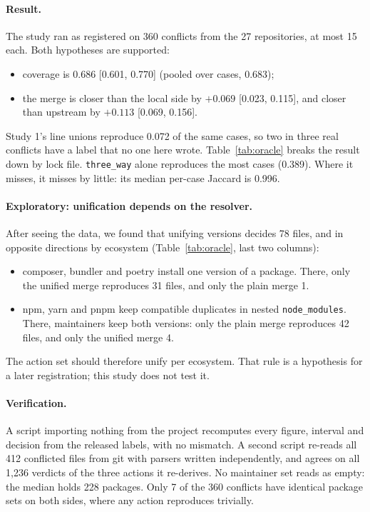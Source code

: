 \documentclass[11pt]{article}
\newcommand{\code}[1]{\texttt{#1}}
\begin{document}
\paragraph{Result.}
The study ran as registered on 360 conflicts from the 27 repositories, at most 15 each. Both
hypotheses are supported:
\begin{itemize}
  \item coverage is 0.686 [0.601, 0.770] (pooled over cases, 0.683);
  \item the merge is closer than the local side by $+0.069$ [0.023, 0.115], and closer than
  upstream by $+0.113$ [0.069, 0.156].
\end{itemize}
Study 1's line unions reproduce 0.072 of the same cases, so two in three real conflicts have a
label that no one here wrote. Table~\ref{tab:oracle} breaks the result down by lock file.
\code{three\_way} alone reproduces the most cases (0.389). Where it misses, it misses by little:
its median per-case Jaccard is 0.996.

\begin{table}[t]
\centering
\caption{Study 3 by lock file: conflicted files, those some computed action reproduces, those each
action reproduces, and those only one of the two three-way merges reproduces.}
\label{tab:oracle}
\small
\setlength{\tabcolsep}{3pt}
\resizebox{\linewidth}{!}{}
\end{table}

\paragraph{Exploratory: unification depends on the resolver.}
After seeing the data, we found that unifying versions decides 78 files, and in opposite
directions by ecosystem (Table~\ref{tab:oracle}, last two columns):
\begin{itemize}
  \item composer, bundler and poetry install one version of a package. There, only the unified
  merge reproduces 31 files, and only the plain merge 1.
  \item npm, yarn and pnpm keep compatible duplicates in nested \code{node\_modules}. There,
  maintainers keep both versions: only the plain merge reproduces 42 files, and only the unified
  merge 4.
\end{itemize}
The action set should therefore unify per ecosystem. That rule is a hypothesis for a later
registration; this study does not test it.

\paragraph{Verification.}
A script importing nothing from the project recomputes every figure, interval and decision from
the released labels, with no mismatch. A second script re-reads all 412 conflicted files from git
with parsers written independently, and agrees on all 1,236 verdicts of the three actions it
re-derives. No maintainer set reads as empty: the median holds 228 packages. Only 7 of the 360
conflicts have identical package sets on both sides, where any action reproduces trivially.
\end{document}
